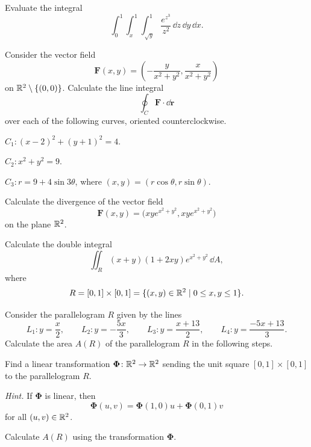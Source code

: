 \begin{problem}
Evaluate the integral
\[
\int_0^1\int_x^1\int_{\sqrt y}^{1}
\frac{e^{z^3}}{z^2}\,\dd z\,\dd y\,\dd x.
\]
\end{problem}

\begin{problem}
Consider the vector field
\[
\mathbf F(x, y)=
\left(
-\frac{y}{x^2+y^2},
\frac{x}{x^2+y^2}
\right)
\]
on $\mathbb{R}^2\setminus\{(0, 0)\}$. Calculate the line integral
\[
\oint_C\mathbf F\cdot\dd\mathbf r
\]
over each of the following curves, oriented counterclockwise.
\begin{problemsubparts}
\item $C_1\colon (x-2)^2+(y+1)^2=4$.
\item $C_2\colon x^2+y^2=9$.
\item $C_3\colon r=9+4\sin 3\theta$, where $(x, y)=(r\cos\theta, r\sin\theta)$.
\end{problemsubparts}
\end{problem}

\begin{problem}
\begin{problemsubparts}
\item Calculate the divergence of the vector field
\[
\mathbf F(x, y)=
\bigl(xy e^{x^2+y^2}, xy e^{x^2+y^2}\bigr)
\]
on the plane $\mathbb{R}^2$.
\item Calculate the double integral
\[
\iint_R (x+y)(1+2xy)e^{x^2+y^2}\,\dd A,
\]
where
\[
R=[0, 1]\times[0, 1]
=\{(x, y)\in\mathbb{R}^2\mid 0\le x, y\le1\}.
\]
\end{problemsubparts}
\end{problem}

\begin{problem}
Consider the parallelogram $R$ given by the lines
\[
L_1\colon y=\frac{x}{2},
\qquad
L_2\colon y=-\frac{5x}{3},
\qquad
L_3\colon y=\frac{x+13}{2},
\qquad
L_4\colon y=\frac{-5x+13}{3}.
\]
Calculate the area $A(R)$ of the parallelogram $R$ in the following steps.
\begin{problemsubparts}
\item Find a linear transformation $\boldsymbol{\Phi}\colon\mathbb{R}^2\to\mathbb{R}^2$ sending the unit square $[0, 1]\times[0, 1]$ to the parallelogram $R$.

\textit{Hint.} If $\boldsymbol{\Phi}$ is linear, then
\[
\boldsymbol{\Phi}(u, v)
=\boldsymbol{\Phi}(1, 0)u+\boldsymbol{\Phi}(0, 1)v
\]
for all $(u, v)\in\mathbb{R}^2$.
\item Calculate $A(R)$ using the transformation $\boldsymbol{\Phi}$.
\end{problemsubparts}
\end{problem}

